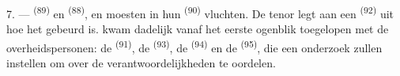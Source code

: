 7. ---  \textsuperscript{(89)} en 
\textsuperscript{(88)},  en  moesten in hun
 \textsuperscript{(90)} vluchten. De tenor legt aan een
 \textsuperscript{(92)} uit hoe het gebeurd is.  kwam dadelijk vanaf het eerste ogenblik toegelopen met de overheidspersonen: de
 \textsuperscript{(91)}, de
 \textsuperscript{(93)}, de 
\textsuperscript{(94)} en de  \textsuperscript{(95)}, die een
onderzoek zullen instellen om over de verantwoordelijkheden te oordelen.
\VUsaut{6.0mm}
\VUfilet{22mm}
